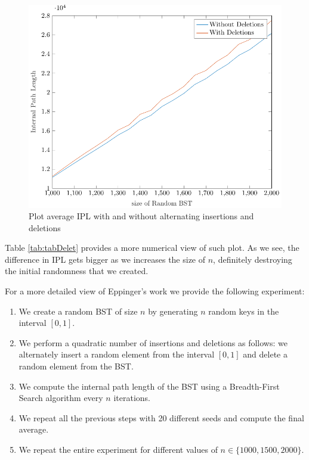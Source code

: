 \begin{figure}[ht]
    \centering
    \includegraphics[scale=0.65]{plotDeletion.pdf}
    \caption{Plot average IPL with and without alternating insertions and deletions}
    \label{fig:plotDeletion}
\end{figure}

\newpage

Table \ref{tab:tabDelet} provides a more numerical view of such plot. As we see, the difference in IPL gets bigger as we increases the size of $n$, definitely destroying the initial randomness that we created.



For a more detailed view of Eppinger's work we provide the following experiment:

\begin{enumerate}
    \item We create a random BST of size \( n \) by generating \( n \) random keys in the interval \( [0,1] \).
    \item We perform a quadratic number of insertions and deletions as follows: we alternately insert a random element from the interval \( [0,1] \) and delete a random element from the BST.
    \item We compute the internal path length of the BST using a Breadth-First Search algorithm every $n$ iterations.
    \item We repeat all the previous steps with 20 different seeds and compute the final average.
    \item We repeat the entire experiment for different values of \( n \in \{1000, 1500, 2000\} \).
\end{enumerate}
\newpage

